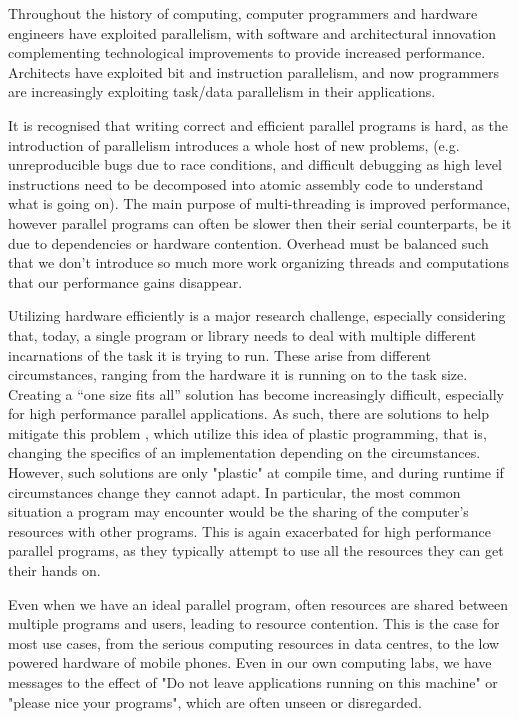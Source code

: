 
Throughout the history of computing, computer programmers and hardware engineers have exploited parallelism, with software and architectural innovation complementing technological improvements to provide increased performance. Architects have exploited bit and instruction parallelism, and now programmers are increasingly exploiting task/data parallelism in their applications.

It is recognised that writing correct and efficient parallel programs is hard, \cite {parallel_challenges} as the introduction of parallelism introduces a whole host of new problems, (e.g. unreproducible bugs due to race conditions, and difficult debugging as high level instructions need to be decomposed  into atomic assembly code to understand what is going on). The main purpose of multi-threading is improved performance, however parallel programs can often be slower then their serial counterparts, be it due to dependencies or hardware contention. Overhead must be balanced such that we don't introduce so much more work organizing threads and computations that our performance gains disappear.

Utilizing hardware efficiently is a major research challenge, especially considering that, today, a single program or library needs to deal with multiple different incarnations of the task it is trying to run. These arise from different circumstances, ranging from the hardware it is running on to the task size. Creating a ``one size fits all'' solution has become increasingly difficult, especially for high performance parallel applications. As such, there are solutions to help mitigate this problem \cite{petabricks}, which utilize this idea of plastic programming, that is, changing the specifics of an implementation depending on the circumstances. However, such solutions are only "plastic" at compile time, and during runtime if circumstances change they cannot adapt. In particular, the most common situation a program may encounter would be the sharing of the computer's resources with other programs. This is again exacerbated for high performance parallel programs, as they typically attempt to use all the resources they can get their hands on.

Even when we have an ideal parallel program, often resources are shared between multiple programs and users, leading to resource contention. This is the case for most use cases, from the serious computing resources in data centres, to the low powered hardware of mobile phones. Even in our own computing labs, we have messages to the effect of "Do not leave applications running on this machine" or "please nice your programs", which are often unseen or disregarded.

